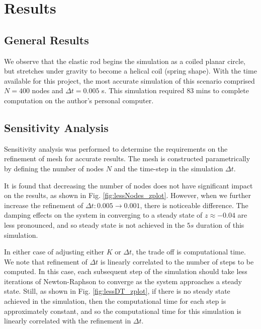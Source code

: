 \documentclass[letterpaper, 10 pt, conference]{ieeeconf}  %
\begin{document}
\section{Results}

\subsection{General Results}

We observe that the elastic rod begins the simulation as a coiled planar circle, but stretches under gravity to become a helical coil (spring shape).
With the time available for this project, the most accurate simulation of this scenario comprised $N=400$ nodes and $\Delta t = 0.005$ s.
This simulation required 83 mins to complete computation on the author's personal computer.



\subsection{Sensitivity Analysis}

Sensitivity analysis was performed to determine the requirements on the refinement of mesh for accurate results.
The mesh is constructed parametrically by defining the number of nodes $N$ and the time-step in the simulation $\Delta t$.

It is found that decreasing the number of nodes does not have significant impact on the results, as shown in Fig. \ref{fig:lessNodes_zplot}.
However, when we further increase the refinement of $\Delta t: 0.005 \rightarrow 0.001$, there is noticeable difference.
The damping effects on the system in converging to a steady state of $z \approx -0.04$ are less pronounced, and so steady state is not achieved in the $5s$ duration of this simulation.


In either case of adjusting either $K$ or $\Delta t$, the trade off is computational time.
We note that refinement of $\Delta t$ is linearly correlated to the number of steps to be computed. 
In this case, each subsequent step of the simulation should take less iterations of Newton-Raphson to converge as the system approaches a steady state.
Still, as shown in Fig. \ref{fig:lessDT_zplot}, if there is no steady state achieved in the simulation, then the computational time for each step is approximately constant, and so the computational time for this simulation is linearly correlated with the refinement in $\Delta t$.
\end{document}
